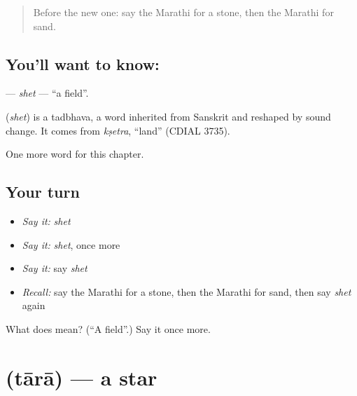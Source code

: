 \label{lesson:MR-C97-shet}



\begin{quote}
Before the new one: say the Marathi for a stone, then the Marathi for sand.
\end{quote}

\subsection*{You'll want to know: }
\textbf{} — \emph{shet} — \textquotedblleft{}a field\textquotedblright{}.

\begin{cousinweb}
\textbf{} (\emph{shet}) is a tadbhava, a word inherited from Sanskrit and reshaped by sound change. It comes from \emph{kṣetra}, \textquotedblleft{}land\textquotedblright{} (CDIAL 3735).
\end{cousinweb}

\begin{grammarlens}[title={What you've built}]
One more word for this chapter.
\end{grammarlens}

\subsection*{Your turn}
\begin{itemize}
\raggedright
  \item \emph{Say it:} \emph{shet}
  \item \emph{Say it:} \emph{shet}, once more
  \item \emph{Say it:} say \emph{shet}
  \item \emph{Recall:} say the Marathi for a stone, then the Marathi for sand, then say \emph{shet} again
\end{itemize}

\begin{tcolorbox}[breakable,colback=teal!4,colframe=teal!35!black,title={Before you move on}]
What does  mean? (\textquotedblleft{}A field\textquotedblright{}.) Say it once more.
\end{tcolorbox}
\section[\texorpdfstring{\mr{तारा} (tārā)}{तारा (tārā)}]{ (tārā) — a star}

\label{lesson:MR-C97-tara}



